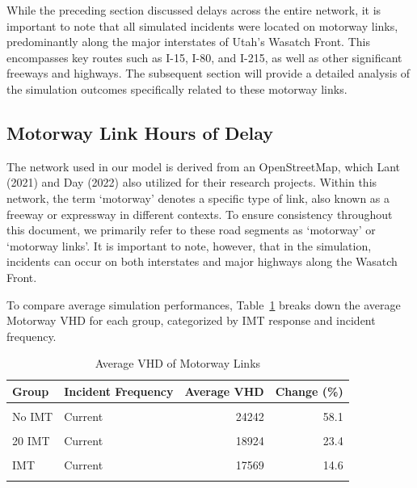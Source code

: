 \documentclass[fancy, oneside, mastersfancy, ms]{byuthesis}
\begin{document}
While the preceding section discussed delays across the entire network,
it is important to note that all simulated incidents were located on
motorway links, predominantly along the major interstates of Utah's
Wasatch Front. This encompasses key routes such as I-15, I-80, and
I-215, as well as other significant freeways and highways. The
subsequent section will provide a detailed analysis of the simulation
outcomes specifically related to these motorway links.

\hypertarget{motorway-link-hours-of-delay}{%
\subsection{Motorway Link Hours of
Delay}\label{motorway-link-hours-of-delay}}

The network used in our model is derived from an OpenStreetMap, which
Lant (2021) and Day (2022) also utilized for their research projects.
Within this network, the term `motorway' denotes a specific type of
link, also known as a freeway or expressway in different contexts. To
ensure consistency throughout this document, we primarily refer to these
road segments as `motorway' or `motorway links'. It is important to
note, however, that in the simulation, incidents can occur on both
interstates and major highways along the Wasatch Front.

To compare average simulation performances,
Table~\ref{tbl-motorway_delays_table} breaks down the average Motorway
VHD for each group, categorized by IMT response and incident frequency.

\hypertarget{tbl-motorway_delays_table}{}
\begin{table}
\caption{\label{tbl-motorway_delays_table}Average VHD of Motorway Links }\tabularnewline

\centering
\begin{tabular}[t]{llrr}
\toprule
\textbf{Group} & \textbf{Incident Frequency} & \textbf{Average VHD} & \textbf{Change (\%)}\\
\midrule
\cellcolor{gray!6}{Baseline} & \cellcolor{gray!6}{-} & \cellcolor{gray!6}{15335} & \cellcolor{gray!6}{0.0}\\
No IMT & Current & 24242 & 58.1\\
\cellcolor{gray!6}{No IMT} & \cellcolor{gray!6}{Increased} & \cellcolor{gray!6}{22321} & \cellcolor{gray!6}{45.6}\\
20 IMT & Current & 18924 & 23.4\\
\cellcolor{gray!6}{20 IMT} & \cellcolor{gray!6}{Increased} & \cellcolor{gray!6}{19176} & \cellcolor{gray!6}{25.0}\\
\addlinespace
30 IMT & Current & 17569 & 14.6\\
\cellcolor{gray!6}{30 IMT} & \cellcolor{gray!6}{Increased} & \cellcolor{gray!6}{18327} & \cellcolor{gray!6}{19.5}\\
\bottomrule
\end{tabular}
\end{table}
\end{document}
